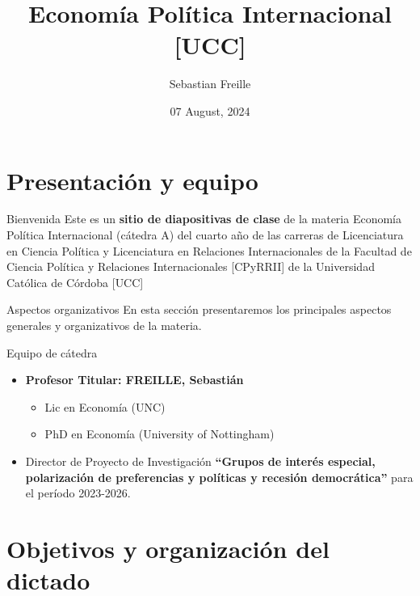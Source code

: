 \documentclass[
  ignorenonframetext,
]{beamer}
\title{Economía Política Internacional {[}UCC{]}}
\author{Sebastian Freille}
\date{07 August, 2024}
\providecommand{\tightlist}{%
  \setlength{\itemsep}{0pt}\setlength{\parskip}{0pt}}\usepackage{longtable,booktabs,array}
\begin{document}
\frame{\titlepage}
\ifdefined\Shaded\renewenvironment{Shaded}{\begin{tcolorbox}[borderline west={3pt}{0pt}{shadecolor}, breakable, interior hidden, boxrule=0pt, enhanced, frame hidden, sharp corners]}{\end{tcolorbox}}\fi

\hypertarget{presentaciuxf3n-y-equipo}{%
\section{Presentación y equipo}\label{presentaciuxf3n-y-equipo}}

\begin{frame}{Bienvenida}
\protect\hypertarget{bienvenida}{}
Este es un \textbf{sitio de diapositivas de clase} de la materia
Economía Política Internacional (cátedra A) del cuarto año de las
carreras de Licenciatura en Ciencia Política y Licenciatura en
Relaciones Internacionales de la Facultad de Ciencia Política y
Relaciones Internacionales {[}CPyRRII{]} de la Universidad Católica de
Córdoba {[}UCC{]}
\end{frame}

\begin{frame}{Aspectos organizativos}
\protect\hypertarget{aspectos-organizativos}{}
En esta sección presentaremos los principales aspectos generales y
organizativos de la materia.
\end{frame}

\begin{frame}{Equipo de cátedra}
\protect\hypertarget{equipo-de-cuxe1tedra}{}
\begin{itemize}
\tightlist
\item
  \textbf{Profesor Titular: FREILLE, Sebastián}

  \begin{itemize}
  \tightlist
  \item
    Lic en Economía (UNC)
  \item
    PhD en Economía (University of Nottingham)
  \end{itemize}
\item
  Director de Proyecto de Investigación \textbf{``Grupos de interés
  especial, polarización de preferencias y políticas y recesión
  democrática''} para el período 2023-2026.
\end{itemize}
\end{frame}

\hypertarget{objetivos-y-organizaciuxf3n-del-dictado}{%
\section{Objetivos y organización del
dictado}\label{objetivos-y-organizaciuxf3n-del-dictado}}
\end{document}
